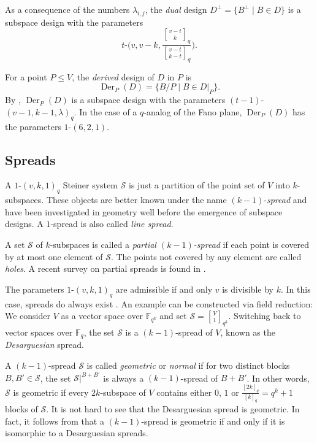 \documentclass[a4paper,abstracton,12pt]{scrartcl}
\newcommand{\F}{\mathbb{F}}
\newcommand{\qbinom}[3]{\genfrac{[}{]}{0pt}{}{#1}{#2}_{#3}}
\newcommand{\qnumb}[2]{[#1]_{#2}}
\DeclareMathOperator{\Der}{Der}
\theoremstyle{definition}
\theoremstyle{remark}
\begin{document}
As a consequence of the numbers $\lambda_{i,j}$, the \emph{dual} design $D^\perp = \{B^\perp \mid B\in D\}$ is a subspace design with the parameters
\[
t\text{-}\Big(v,v-k,\frac{\qbinom{v-t}{k}{q}}{\qbinom{v-t}{k-t}{q}}\Big)\text{.}
\]

For a point $P \leq V$, the \emph{derived} design of $D$ in $P$ is
\[
	\Der_P(D) = \{ B/P \mid B \in D|_P\}\text{.}
\]
By \cite{Kiermaier-Laue-2015-AiMoC9[1]:105-115}, $\Der_P(D)$ is a subspace design with the parameters $(t-1)$-$(v-1,k-1,\lambda)_q$.
In the case of a $q$-analog of the Fano plane, $\Der_P(D)$ has the parameters $1$-$(6,2,1)$.

\subsection{Spreads}

A $1$-$(v,k,1)_q$ Steiner system $\mathcal{S}$ is just a partition of the point set of $V$ into $k$-subspaces.
These objects are better known under the name $(k-1)$-\emph{spread} and have been investigated in geometry well before the emergence of subspace designs.
A $1$-spread is also called \emph{line spread}.

A set $\mathcal{S}$ of $k$-subspaces is called a \emph{partial $(k-1)$-spread} if each point is covered by at most one element of $\mathcal{S}$.
The points not covered by any element are called \emph{holes}.
A recent survey on partial spreads is found in \cite{Honold-Kiermaier-Kurz-2018-COST}.

The parameters $1$-$(v,k,1)_q$ are admissible if and only $v$ is divisible by $k$.
In this case, spreads do always exist \cite[\S VI]{Segre-1964-AnnDMPA64[1]:1-76}.
An example can be constructed via field reduction:
We consider $V$ as a vector space over $\F_{q^k}$ and set $\mathcal{S} =  \qbinom{V}{1}{q^k}$.
Switching back to vector spaces over $\F_q$, the set $\mathcal{S}$ is a $(k-1)$-spread of $V$, known as the \emph{Desarguesian} spread.

A $(k-1)$-spread $\mathcal{S}$ is called \emph{geometric} or \emph{normal} if for two distinct blocks $B,B'\in\mathcal{S}$, the set $\mathcal{S}|^{B + B'}$ is always a $(k-1)$-spread of $B + B'$.
In other words, $\mathcal{S}$ is geometric if every $2k$-subspace of $V$ contains either $0$, $1$ or $\frac{\qnumb{2k}{q}}{\qnumb{k}{q}} = q^k + 1$ blocks of $\mathcal{S}$.
It is not hard to see that the Desarguesian spread is geometric.
In fact, it follows from \cite[Theorem~2]{Barlotti-Cofman-1974-AmSUHamb40:231-241} that a $(k-1)$-spread is geometric if and only if it is isomorphic to a Desarguesian spreads.
\end{document}
